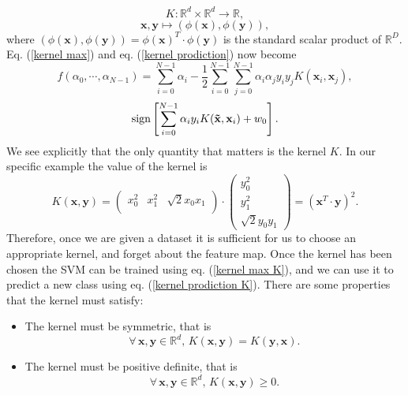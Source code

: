 \documentclass[12pt]{article}
\begin{document}
$$K:\mathbb{R}^d\times \mathbb{R}^d\rightarrow \mathbb{R},$$
\begin{equation}
    \mathbf{x}, \mathbf{y}\mapsto(\phi(\mathbf{x}), \phi(\mathbf{y})),
\end{equation}
 where $(\phi(\mathbf{x}), \phi(\mathbf{y}))=\phi(\mathbf{x})^T\cdot \phi(\mathbf{y})$ is the standard scalar product of $\mathbb{R}^D$. Eq. (\ref{kernel max}) and eq. (\ref{kernel prodiction}) now become 
 \begin{equation}
    f(\alpha_0,\cdots,\alpha_{N-1})=\sum_{i=0}^{N-1} \alpha_i-\frac{1}{2}\sum_{i=0}^{N-1}\sum_{j=0}^{N-1}\alpha_i\alpha_jy_iy_jK(\mathbf{x}_i,\mathbf{x}_j),
    \label{kernel max K}
\end{equation}
\begin{equation}
    \textup{sign}\left[\sum_{i=0}^{N-1}\alpha_iy_iK(\mathbf{\tilde{x}}, \mathbf{x}_i)+w_0\right].
    \label{kernel prodiction K}
\end{equation}
We see explicitly that the only quantity that matters is the kernel $K$. In our specific example the value of the kernel is 
\begin{equation}
    K(\mathbf{x}, \mathbf{y})= \begin{pmatrix}
        x_0^2 & x_1^2 & \sqrt{2}x_0x_1 \\
        \end{pmatrix}\cdot       \begin{pmatrix}
            y_0^2 \\
            y_1^2\\
            \sqrt{2}y_0y_1
            \end{pmatrix}=(\mathbf{x}^T\cdot\mathbf{y})^2.   
            \label{polykernel ex}   
\end{equation}
Therefore, once we are given a dataset it is sufficient for us to choose an appropriate kernel, and forget about the feature map. Once the kernel has been chosen the SVM can be trained using eq. (\ref{kernel max K}), and we can use it to predict a new class using eq. (\ref{kernel prodiction K}). There are some properties that the kernel must satisfy:
\begin{itemize}
    \item The kernel must be symmetric, that is $$\forall\, \mathbf{x},\mathbf{y}\in \mathbb{R}^d,\,K(\mathbf{x},\mathbf{y})=K(\mathbf{y},\mathbf{x}).$$
    \item The kernel must be positive definite, that is $$\forall\, \mathbf{x},\mathbf{y}\in \mathbb{R}^d,\,K(\mathbf{x},\mathbf{y})\geq 0.$$
\end{itemize}
\end{document}
